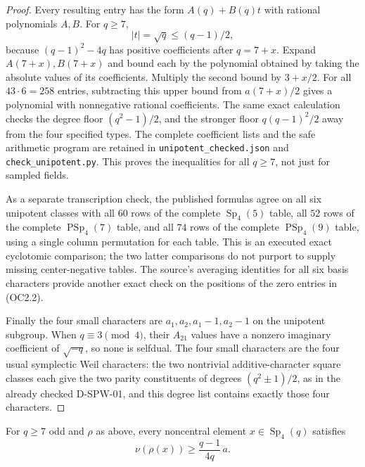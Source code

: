 \begin{proof}
Every resulting entry has the form $A(q)+B(q)t$ with rational
polynomials $A,B$. For $q\ge7$,
\[
        |t|=\sqrt q\le(q-1)/2,                                \tag{OC2.4}
\]
because $(q-1)^2-4q$ has positive coefficients after $q=7+x$.
Expand $A(7+x),B(7+x)$ and bound each by the polynomial obtained by
taking the absolute values of its coefficients. Multiply the second
bound by $3+x/2$. For all $43\cdot6=258$ entries, subtracting this
upper bound from $a(7+x)/2$ gives a polynomial with nonnegative
rational coefficients. The same exact calculation checks the degree
floor $(q^2-1)/2$, and the stronger floor $q(q-1)^2/2$ away from the
four specified types. The complete coefficient lists and the safe
arithmetic program are retained in \texttt{unipotent\_checked.json}
and \texttt{check\_unipotent.py}. This proves the inequalities for
all $q\ge7$, not just for sampled fields.

As a separate transcription check, the published formulas agree on
all six unipotent classes with all $60$ rows of the complete
$\operatorname{Sp}_4(5)$ table, all $52$ rows of the complete
$\operatorname{PSp}_4(7)$ table, and all $74$ rows of the complete
$\operatorname{PSp}_4(9)$ table, using a single column permutation
for each table. This is an executed exact cyclotomic comparison;
the two latter comparisons do not purport to supply missing
center-negative tables. The source's averaging identities for all six
basis characters provide another exact check on the positions of the
zero entries in (OC2.2).

Finally the four small characters are $a_1,a_2,a_1-1,a_2-1$ on the
unipotent subgroup. When $q\equiv3\pmod4$, their $A_{21}$ values
have a nonzero imaginary coefficient of $\sqrt{-q}$, so none is
selfdual. The four small characters are the four usual symplectic
Weil characters: the two nontrivial additive-character square classes
each give the two parity constituents of degrees $(q^2\pm1)/2$,
as in the already checked D-SPW-01, and this degree list contains
exactly those four characters.
\end{proof}

\begin{lemma}
\label{D-OC2-02}
For $q\ge7$ odd and $\rho$ as above, every noncentral element
$x\in\operatorname{Sp}_4(q)$ satisfies
\[
                   \nu(\rho(x))\ge \frac{q-1}{4q}\,a.
                                                               \tag{OC2.5}
\]
\end{lemma}

